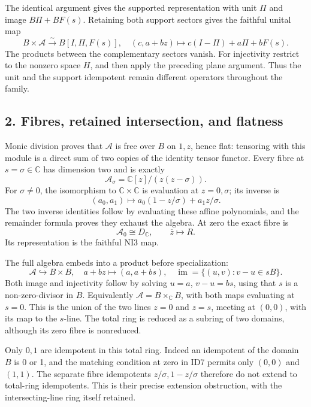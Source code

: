 \documentclass[
]{article}
\begin{document}
The identical argument gives the supported representation with unit
\(\Pi\) and image \(B\Pi+BF(s)\). Retaining both support sectors gives
the faithful unital map \[
B\times\mathcal A\xrightarrow{\sim}B[I,\Pi,F(s)],
\quad(c,a+bz)\longmapsto c(I-\Pi)+a\Pi+bF(s).
\tag{ID4}
\] The products between the complementary sectors vanish. For
injectivity restrict to the nonzero space \(H\), and then apply the
preceding plane argument. Thus the unit and the support idempotent
remain different operators throughout the family.

\subsection{2. Fibres, retained intersection, and
flatness}\label{fibres-retained-intersection-and-flatness}

Monic division proves that \(\mathcal A\) is free over \(B\) on \(1,z\),
hence flat: tensoring with this module is a direct sum of two copies of
the identity tensor functor. Every fibre at \(s=\sigma\in\mathbb C\) has
dimension two and is exactly \[
\mathcal A_\sigma=\mathbb C[z]/(z(z-\sigma)).
\tag{ID5}
\] For \(\sigma\ne0\), the isomorphism to \(\mathbb C\times\mathbb C\)
is evaluation at \(z=0,\sigma\); its inverse is \[
(a_0,a_1)\longmapsto a_0(1-z/\sigma)+a_1z/\sigma.
\] The two inverse identities follow by evaluating these affine
polynomials, and the remainder formula proves they exhaust the algebra.
At zero the exact fibre is \[
\mathcal A_0\cong D_{\mathbb C},\qquad
\overline z\longmapsto R.
\tag{ID6}
\] Its representation is the faithful NI3 map.

The full algebra embeds into a product before specialization: \[
\mathcal A\hookrightarrow B\times B,\quad
a+bz\longmapsto(a,a+bs),
\quad\operatorname{im}=\{(u,v):v-u\in sB\}.
\tag{ID7}
\] Both image and injectivity follow by solving \(u=a\), \(v-u=bs\),
using that \(s\) is a non-zero-divisor in \(B\). Equivalently
\(\mathcal A=B\times_{\mathbb C}B\), with both maps evaluating at
\(s=0\). This is the union of the two lines \(z=0\) and \(z=s\), meeting
at \((0,0)\), with its map to the \(s\)-line. The total ring is reduced
as a subring of two domains, although its zero fibre is nonreduced.

Only \(0,1\) are idempotent in this total ring. Indeed an idempotent of
the domain \(B\) is 0 or 1, and the matching condition at zero in ID7
permits only \((0,0)\) and \((1,1)\). The separate fibre idempotents
\(z/\sigma,1-z/\sigma\) therefore do not extend to total-ring
idempotents. This is their precise extension obstruction, with the
intersecting-line ring itself retained.
\end{document}
